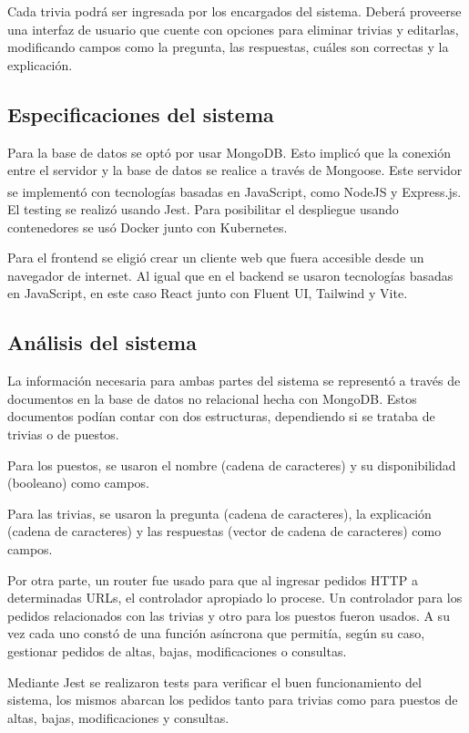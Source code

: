 \documentclass[twoside]{article}
\begin{document}
Cada trivia podrá ser ingresada por los encargados del sistema. Deberá proveerse una interfaz de usuario que cuente con opciones para eliminar trivias y editarlas, modificando campos como la pregunta, las respuestas, cuáles son correctas y la explicación.
\subsection{Especificaciones del sistema}
Para la base de datos se optó por usar MongoDB. Esto implicó que la conexión entre el servidor y la base de datos se realice a través de Mongoose. Este servidor se implementó con tecnologías basadas en JavaScript, como NodeJS\textsuperscript{\textregistered} y Express.js. El testing se realizó usando Jest. Para posibilitar el despliegue usando contenedores se usó Docker junto con Kubernetes.

Para el frontend se eligió crear un cliente web que fuera accesible desde un navegador de internet. Al igual que en el backend se usaron tecnologías basadas en JavaScript, en este caso React junto con Fluent UI, Tailwind y Vite.
\subsection{Análisis del sistema}
La información necesaria para ambas partes del sistema se representó a través de documentos en la base de datos no relacional hecha con MongoDB. Estos documentos podían contar con dos estructuras, dependiendo si se trataba de trivias o de puestos.

Para los puestos, se usaron el nombre (cadena de caracteres) y su disponibilidad (booleano) como campos.

Para las trivias, se usaron la pregunta (cadena de caracteres), la explicación (cadena de caracteres) y las respuestas (vector de cadena de caracteres) como campos.

Por otra parte, un router fue usado para que al ingresar pedidos HTTP a determinadas URLs, el controlador apropiado lo procese. Un controlador para los pedidos relacionados con las trivias y otro para los puestos fueron usados. A su vez cada uno constó de una función asíncrona que permitía, según su caso, gestionar pedidos de altas, bajas, modificaciones o consultas.

Mediante Jest se realizaron tests para verificar el buen funcionamiento del sistema, los mismos abarcan los pedidos tanto para trivias como para puestos de altas, bajas, modificaciones y consultas.
\end{document}
